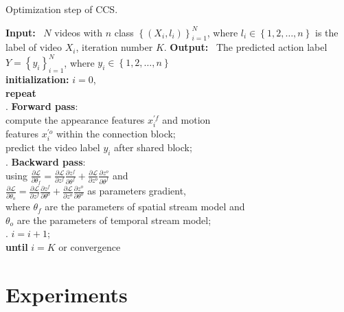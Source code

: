 \documentclass[conference,compsoc]{IEEEtran}
\begin{document}
\begin{algorithm}[h]
    \caption{Optimization step of CCS.}
\begin{algorithmic}
    \STATE \textbf{Input:}~ $N$ videos with $n$ class $\left \{ (X_{i}, l_{i}) \right \}_{i=1}^{N}$, where $l_{i} \in \left \{1, 2, \ldots, n \right \}$ is the label of video $X_{i}$, iteration number $K$.
    \STATE \textbf{Output:}~ The predicted action label $Y=\left\{y_{i}\right\}_{i=1}^{N}$, where $y_{i} \in \left\{1, 2, \ldots, n\right\}$ \\
    \STATE \textbf{initialization:} $i=0$,\\
    \STATE \textbf{repeat}\\
\quad {}. \textbf{Forward pass}: \\
\quad \quad {} compute the appearance features $x_{i}^{\prime f}$ and motion \\
\quad \quad \quad   features $x_{i}^{\prime o}$ within the connection block;\\
\quad \quad {} predict the video label $y_{i}$ after shared block;\\
\quad {}. \textbf{Backward pass}:\\
\quad \quad \quad using $ \frac{\partial \mathcal{L}}{\partial \theta_{f}} = \frac{\partial \mathcal{L}}{\partial z^{f}}\frac{\partial z^{f}}{\partial \theta^{f}} + \frac{\partial \mathcal{L}}{\partial z^{o}}\frac{\partial z^{o}}{\partial \theta^{f}}$ and\\
\quad \quad \quad $ \frac{\partial \mathcal{L}}{\partial \theta_{o}} = \frac{\partial \mathcal{L}}{\partial z^{f}}\frac{\partial z^{f}}{\partial \theta^{o}} + \frac{\partial \mathcal{L}}{\partial z^{o}}\frac{\partial z^{o}}{\partial \theta^{o}}$ as parameters gradient,\\
\quad \quad \quad where $\theta_{f}$ are the parameters of spatial stream model and \\
\quad \quad \quad $\theta_{o}$ are the parameters of temporal stream model;\\
\quad {}. $i = i + 1$;\\
\STATE \textbf{until} $i = K$ or convergence
\end{algorithmic}
\label{algo:1}
\end{algorithm}

\section{Experiments}
\label{S:4}
\end{document}

